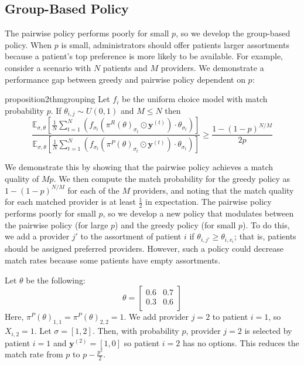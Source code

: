 \subsection{Group-Based Policy}
\label{sec:grouping}
The pairwise policy performs poorly for small $p$, so we develop the group-based policy. 
When $p$ is small, administrators should offer patients larger assortments because a patient's top preference is more likely to be available. 
For example, consider a scenario with $N$ patients and $M$ providers. 
We demonstrate a performance gap between greedy and pairwise policy dependent on $p$: 
\begin{restatable}{proposition2}{thmgrouping}
\label{thm:grouping}
Let $f_{i}$ be the uniform choice model with match probability $p$. 
If $\theta_{i,j} \sim U(0,1)$ and $M \leq N$ then
\begin{equation}
    \frac{\mathbb{E}_{\sigma,\theta}[\frac{1}{N} \sum_{t=1}^{N}  (f_{\sigma_{t}}\left(\pi^{R}(\theta)_{\sigma_{t}} \odot \mathbf{y}^{(t)}\right) \cdot \theta_{\sigma_{t}})]}{\mathbb{E}_{\sigma,\theta}[\frac{1}{N} \sum_{t=1}^{N}  (f_{\sigma_{t}}\left(\pi^{P}(\theta)_{\sigma_{t}} \odot \mathbf{y}^{(t)}\right) \cdot \theta_{\sigma_{t}})]} \geq \frac{1-(1-p)^{N/M}}{2p}
\end{equation}

\end{restatable}
We demonstrate this by showing that the pairwise policy achieves a match quality of $Mp$. 
We then compute the match probability for the greedy policy as $1-(1-p)^{N/M}$ for each of the $M$ providers, and noting that the match quality for each matched provider is at least $\frac{1}{2}$ in expectation. 
The pairwise policy performs poorly for small $p$, so we develop a new policy that modulates between the pairwise policy (for large $p$) and the greedy policy (for small $p$). 
To do this, we add a provider $j'$ to the assortment of patient $i$ if $\theta_{i,j'} \geq \theta_{i,v_{i}}$; that is, patients should be assigned preferred providers. 
However, such a policy could decrease match rates because some patients have empty assortments. 
\begin{example}
    \label{ex:group_based}
    Let $\theta$ be the following: 
    \begin{equation} 
        \theta =
        \begin{bmatrix}
        0.6 & 0.7 \\
        0.3 & 0.6 \\
        \end{bmatrix}
    \end{equation}
    Here, $\pi^{P}(\theta)_{1,1} = \pi^{P}(\theta)_{2,2} = 1$. 
    We add provider $j=2$ to patient $i=1$, so $X_{i,2} = 1$. 
    Let $\sigma=[1,2]$. 
    Then, with probability $p$, provider $j=2$ is selected by patient $i=1$ and $\mathbf{y}^{(2)} = [1,0]$ so patient $i=2$ has no options. 
    This reduces the match rate from $p$ to $p-\frac{p^2}{2}$. 
\end{example}

